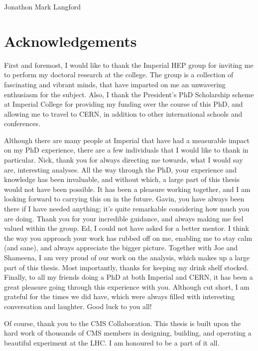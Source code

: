 
\begin{flushright}
    Jonathon Mark Langford
\end{flushright}


\chapter*{\centering Acknowledgements}
First and foremost, I would like to thank the Imperial HEP group for inviting me to perform my doctoral research at the college. The group is a collection of fascinating and vibrant minds, that have imparted on me an unwavering enthusiasm for the subject. Also, I thank the President's PhD Scholarship scheme at Imperial College for providing my funding over the course of this PhD, and allowing me to travel to CERN, in addition to other international schools and conferences. 

Although there are many people at Imperial that have had a measurable impact on my PhD experience, there are a few individuals that I would like to thank in particular. Nick, thank you for always directing me towards, what I would say are, interesting analyses. All the way through the PhD, your experience and knowledge has been invaluable, and without which, a large part of this thesis would not have been possible. It has been a pleasure working together, and I am looking forward to carrying this on in the future. Gavin, you have always been there if I have needed anything; it's quite remarkable considering how much you are doing. Thank you for your incredible guidance, and always making me feel valued within the group. Ed, I could not have asked for a better mentor. I think the way you approach your work has rubbed off on me, enabling me to stay calm (and sane), and always appreciate the bigger picture. Together with Joe and Shameena, I am very proud of our work on the \Hgg analysis, which makes up a large part of this thesis. Most importantly, thanks for keeping my drink shelf stocked. Finally, to all my friends doing a PhD at both Imperial and CERN, it has been a great pleasure going through this experience with you. Although cut short, I am grateful for the times we did have, which were always filled with interesting conversation and laughter. Good luck to you all!

Of course, thank you to the CMS Collaboration. This thesis is built upon the hard work of thousands of CMS members in designing, building, and operating a beautiful experiment at the LHC. I am honoured to be a part of it all.

